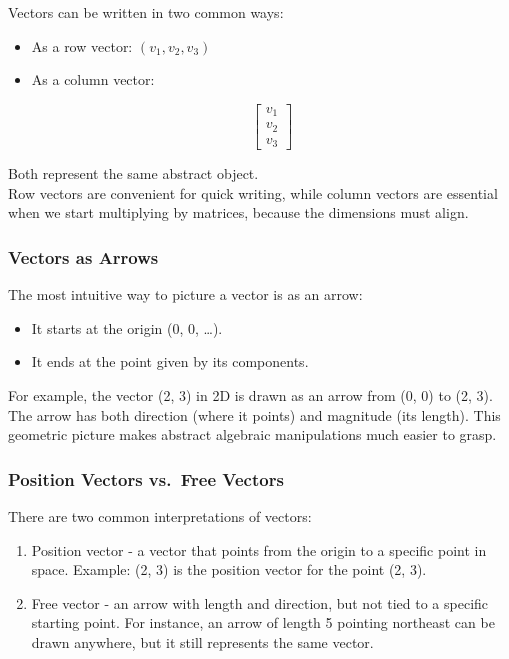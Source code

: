 \documentclass[
  letterpaper,
  DIV=11,
  numbers=noendperiod]{scrreprt}
\providecommand{\tightlist}{%
  \setlength{\itemsep}{0pt}\setlength{\parskip}{0pt}}
\begin{document}
Vectors can be written in two common ways:

\begin{itemize}
\item
  As a row vector: \((v_1, v_2, v_3)\)\\
\item
  As a column vector:

  \[
  \begin{bmatrix}
  v_1 \\
  v_2 \\
  v_3
  \end{bmatrix}
  \]
\end{itemize}

Both represent the same abstract object.\\
Row vectors are convenient for quick writing, while column vectors are
essential when we start multiplying by matrices, because the dimensions
must align.

\subsubsection{Vectors as Arrows}\label{vectors-as-arrows}

The most intuitive way to picture a vector is as an arrow:

\begin{itemize}
\tightlist
\item
  It starts at the origin (0, 0, \ldots).
\item
  It ends at the point given by its components.
\end{itemize}

For example, the vector (2, 3) in 2D is drawn as an arrow from (0, 0) to
(2, 3). The arrow has both direction (where it points) and magnitude
(its length). This geometric picture makes abstract algebraic
manipulations much easier to grasp.

\subsubsection{Position Vectors vs.~Free
Vectors}\label{position-vectors-vs.-free-vectors}

There are two common interpretations of vectors:

\begin{enumerate}
\def\labelenumi{\arabic{enumi}.}
\tightlist
\item
  Position vector - a vector that points from the origin to a specific
  point in space. Example: (2, 3) is the position vector for the point
  (2, 3).
\item
  Free vector - an arrow with length and direction, but not tied to a
  specific starting point. For instance, an arrow of length 5 pointing
  northeast can be drawn anywhere, but it still represents the same
  vector.
\end{enumerate}
\end{document}
